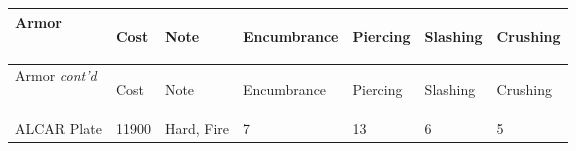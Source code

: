 \documentclass[twoside]{book}
\begin{document}
\begin{longtable}{p{1.25in}llp{2em}p{2em}p{2em}p{2em}} 
  Armor
  &
  \begin{turn}{70}{Cost}\end{turn}
          
  &
  \begin{turn}{70}{Note}\end{turn}
          
  &
  \begin{turn}{70}{Encumbrance}\end{turn}
          
  &
  \begin{turn}{70}{Piercing}\end{turn}
          
  &
  \begin{turn}{70}{Slashing}\end{turn}
          
  &
  \begin{turn}{70}{Crushing}\end{turn}
          
  \\
  \hline
  \hline
  \endfirsthead
  Armor \textit{cont'd}
        
  &
  \begin{turn}{70}{Cost}\end{turn}
          
  &
  \begin{turn}{70}{Note}\end{turn}
          
  &
  \begin{turn}{70}{Encumbrance}\end{turn}
          
  &
  \begin{turn}{70}{Piercing}\end{turn}
          
  &
  \begin{turn}{70}{Slashing}\end{turn}
          
  &
  \begin{turn}{70}{Crushing}\end{turn}
          
  \\
  \hline
  \endhead
      
  \raggedright
           ALCAR Plate 
  &
   11900 
  &
   Hard, Fire 
  &
   7 
  &
   13 
  &
   6 
  &
   5 
  \tabularnewline
      

\end{longtable}
\end{document}
